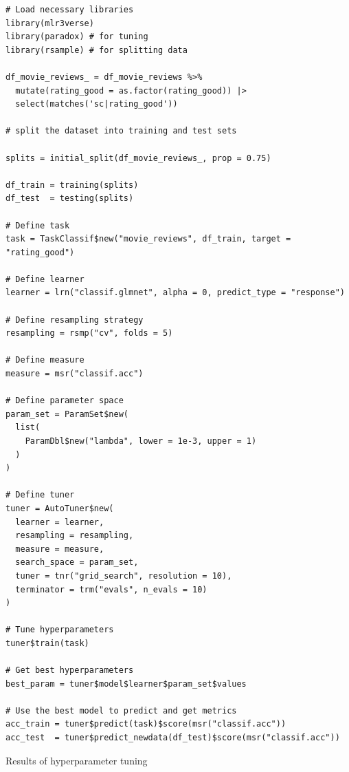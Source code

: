 \documentclass[
  letterpaper,
]{krantz}
\begin{document}
\begin{verbatim}
# Load necessary libraries
library(mlr3verse)
library(paradox) # for tuning
library(rsample) # for splitting data

df_movie_reviews_ = df_movie_reviews %>% 
  mutate(rating_good = as.factor(rating_good)) |> 
  select(matches('sc|rating_good'))

# split the dataset into training and test sets

splits = initial_split(df_movie_reviews_, prop = 0.75)

df_train = training(splits)
df_test  = testing(splits)

# Define task
task = TaskClassif$new("movie_reviews", df_train, target = "rating_good")

# Define learner
learner = lrn("classif.glmnet", alpha = 0, predict_type = "response")

# Define resampling strategy
resampling = rsmp("cv", folds = 5)

# Define measure
measure = msr("classif.acc")

# Define parameter space
param_set = ParamSet$new(
  list(
    ParamDbl$new("lambda", lower = 1e-3, upper = 1)
  )
)

# Define tuner
tuner = AutoTuner$new(
  learner = learner,
  resampling = resampling,
  measure = measure,
  search_space = param_set,
  tuner = tnr("grid_search", resolution = 10),
  terminator = trm("evals", n_evals = 10)
)

# Tune hyperparameters
tuner$train(task)

# Get best hyperparameters
best_param = tuner$model$learner$param_set$values

# Use the best model to predict and get metrics
acc_train = tuner$predict(task)$score(msr("classif.acc"))
acc_test  = tuner$predict_newdata(df_test)$score(msr("classif.acc"))
\end{verbatim}

\begin{table}

\caption{\label{tbl-tune-results-r}Results of hyperparameter tuning}


\end{table}%
\end{document}
